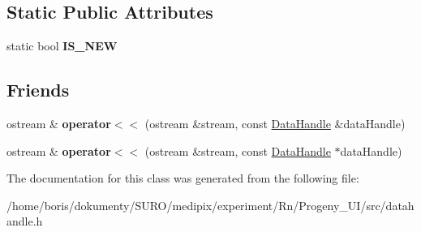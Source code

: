 \subsection*{Static Public Attributes}
\begin{DoxyCompactItemize}
\item 
\hypertarget{classDataHandle_af754b84ee488b481af4f4ada4e7c7a97}{static bool {\bfseries I\-S\-\_\-\-N\-E\-W}}\label{classDataHandle_af754b84ee488b481af4f4ada4e7c7a97}

\end{DoxyCompactItemize}
\subsection*{Friends}
\begin{DoxyCompactItemize}
\item 
\hypertarget{classDataHandle_a1e7c71a630f82999e0d0899a03a17f2b}{ostream \& {\bfseries operator$<$$<$} (ostream \&stream, const \hyperlink{classDataHandle}{Data\-Handle} \&data\-Handle)}\label{classDataHandle_a1e7c71a630f82999e0d0899a03a17f2b}

\item 
\hypertarget{classDataHandle_a405632c8edc40837fe270361ea4a7d05}{ostream \& {\bfseries operator$<$$<$} (ostream \&stream, const \hyperlink{classDataHandle}{Data\-Handle} $\ast$data\-Handle)}\label{classDataHandle_a405632c8edc40837fe270361ea4a7d05}

\end{DoxyCompactItemize}


The documentation for this class was generated from the following file\-:\begin{DoxyCompactItemize}
\item 
/home/boris/dokumenty/\-S\-U\-R\-O/medipix/experiment/\-Rn/\-Progeny\-\_\-\-U\-I/src/datahandle.\-h\end{DoxyCompactItemize}
